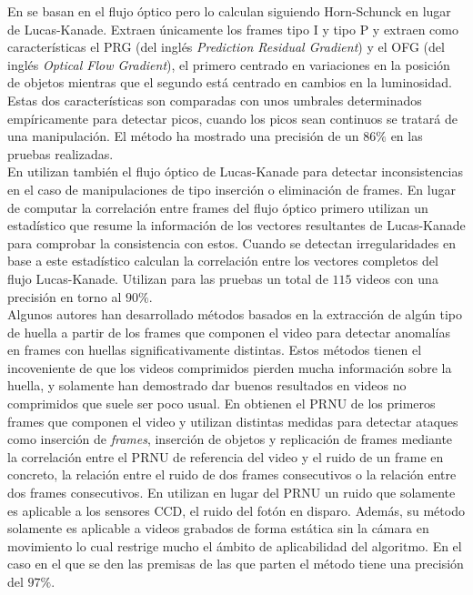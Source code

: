 En \cite{kingra:2017} se basan en el flujo óptico pero lo calculan siguiendo Horn-Schunck en lugar de Lucas-Kanade. Extraen únicamente los frames tipo I y tipo P y extraen como características el PRG (del inglés \textit{Prediction Residual Gradient}) y el OFG (del inglés \textit{Optical Flow Gradient}), el primero centrado en variaciones en la posición de objetos mientras que el segundo está centrado en cambios en la luminosidad. Estas dos características son comparadas con unos umbrales determinados empíricamente para detectar picos, cuando los picos sean continuos se tratará de una manipulación. El método ha mostrado una precisión de un $86\%$ en las pruebas realizadas. \\

En \cite{jia:2018} utilizan también el flujo óptico de Lucas-Kanade para detectar inconsistencias en el caso de manipulaciones de tipo inserción o eliminación de frames. En lugar de computar la correlación entre frames del flujo óptico primero utilizan un estadístico que resume la información de los vectores resultantes de Lucas-Kanade para comprobar la consistencia con estos. Cuando se detectan irregularidades en base a este estadístico calculan la correlación entre los vectores completos del flujo Lucas-Kanade. Utilizan para las pruebas un total de $115$ videos con una precisión en torno al $90\%$. \\

Algunos autores han desarrollado métodos basados en la extracción de algún tipo de huella a partir de los frames que componen el video para detectar anomalías en frames con huellas significativamente distintas. Estos métodos tienen el incoveniente de que los videos comprimidos pierden mucha información sobre la huella, y solamente han demostrado dar buenos resultados en videos no comprimidos que suele ser poco usual. En \cite{mondaini:2007} obtienen el PRNU de los primeros frames que componen el video y utilizan distintas medidas para detectar ataques como inserción de \textit{frames}, inserción de objetos y replicación de frames mediante la correlación entre el PRNU de referencia del video y el ruido de un frame en concreto, la relación entre el ruido de dos frames consecutivos o la relación entre dos frames consecutivos. En \cite{kobayashi:2010} utilizan en lugar del PRNU un ruido que solamente es aplicable a los sensores CCD, el ruido del fotón en disparo. Además, su método solamente es aplicable a videos grabados de forma estática sin la cámara en movimiento lo cual restrige mucho el ámbito de aplicabilidad del algoritmo. En el caso en el que se den las premisas de las que parten el método tiene una precisión del $97\%$. \\

